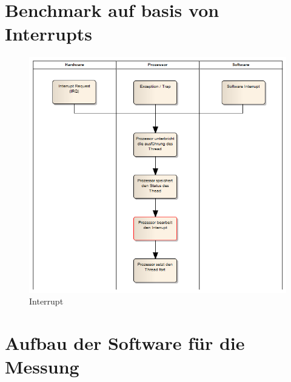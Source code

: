 
\section{Benchmark auf basis von Interrupts}


\begin{figure}[h]
\centering
\includegraphics[scale=0.5]{images/interrupt_ea.png}
\caption{Interrupt}
\label{fig:Interrupt}
\end{figure}

\section{Aufbau der Software für die Messung}




